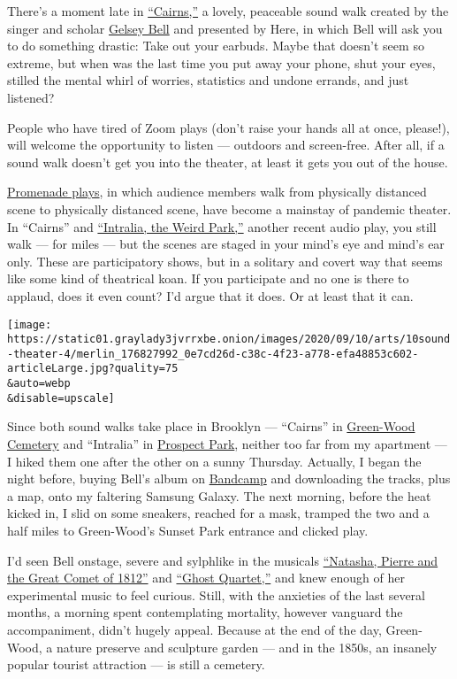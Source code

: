 There's a moment late in
\href{https://here.org/shows/cairns/}{``Cairns,''} a lovely, peaceable
sound walk created by the singer and scholar
\href{https://gelseybell.com/}{Gelsey Bell} and presented by Here, in
which Bell will ask you to do something drastic: Take out your earbuds.
Maybe that doesn't seem so extreme, but when was the last time you put
away your phone, shut your eyes, stilled the mental whirl of worries,
statistics and undone errands, and just listened?

People who have tired of Zoom plays (don't raise your hands all at once,
please!), will welcome the opportunity to listen --- outdoors and
screen-free. After all, if a sound walk doesn't get you into the
theater, at least it gets you out of the house.

\href{https://www.nytimes3xbfgragh.onion/2020/08/12/theater/promenade-theater-walking-pandemic.html}{Promenade
plays}, in which audience members walk from physically distanced scene
to physically distanced scene, have become a mainstay of pandemic
theater. In ``Cairns'' and
\href{https://www.inversiontheatre.com/park}{``Intralia, the Weird
Park,''} another recent audio play, you still walk --- for miles --- but
the scenes are staged in your mind's eye and mind's ear only. These are
participatory shows, but in a solitary and covert way that seems like
some kind of theatrical koan. If you participate and no one is there to
applaud, does it even count? I'd argue that it does. Or at least that it
can.

\texttt{[image: https://static01.graylady3jvrrxbe.onion/images/2020/09/10/arts/10sound-theater-4/merlin\_176827992\_0e7cd26d-c38c-4f23-a778-efa48853c602-articleLarge.jpg?quality=75\\\&auto=webp\\\&disable=upscale]}

Since both sound walks take place in Brooklyn --- ``Cairns'' in
\href{https://www.green-wood.com/}{Green-Wood Cemetery} and ``Intralia''
in \href{https://www.prospectpark.org/}{Prospect Park}, neither too far
from my apartment --- I hiked them one after the other on a sunny
Thursday. Actually, I began the night before, buying Bell's album on
\href{https://bandcamp.com/}{Bandcamp} and downloading the tracks, plus
a map, onto my faltering Samsung Galaxy. The next morning, before the
heat kicked in, I slid on some sneakers, reached for a mask, tramped the
two and a half miles to Green-Wood's Sunset Park entrance and clicked
play.

I'd seen Bell onstage, severe and sylphlike in the musicals
\href{https://www.nytimes3xbfgragh.onion/2016/11/15/theater/natasha-pierre-and-the-great-comet-of-1812-review.html}{``Natasha,
Pierre and the Great Comet of 1812''} and
\href{https://www.nytimes3xbfgragh.onion/2014/10/11/theater/dave-malloys-ghost-quartet-at-the-bushwick-starr.html}{``Ghost
Quartet,''} and knew enough of her experimental music to feel curious.
Still, with the anxieties of the last several months, a morning spent
contemplating mortality, however vanguard the accompaniment, didn't
hugely appeal. Because at the end of the day, Green-Wood, a nature
preserve and sculpture garden --- and in the 1850s, an insanely popular
tourist attraction --- is still a cemetery.


